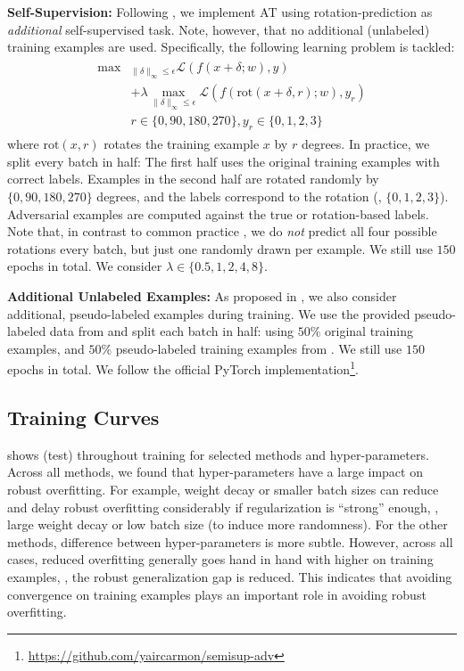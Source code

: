 \textbf{Self-Supervision:} Following \cite{HendrycksNIPS2019}, we implement AT using rotation-prediction as \emph{additional} self-supervised task. Note, however, that no additional (unlabeled) training examples are used. Specifically, the following learning problem is tackled:
\begin{align}
	\begin{split}
		\max&_{\|\delta\|_\infty \leq \epsilon} \mathcal{L}(f(x + \delta;w), y)\\
		&+ \lambda \max_{\|\delta\|_\infty \leq \epsilon} \mathcal{L}(f(\text{rot}(x + \delta, r); w), y_{r})\\
		&r\in\{0, 90, 180, 270\}, y_r \in \{0, 1, 2, 3\}
	\end{split}
\end{align}
where $\text{rot}(x, r)$ rotates the training example $x$ by $r$ degrees.
In practice, we split every batch in half: The first half uses the original training examples with correct labels. Examples in the second half are rotated randomly by $\{0, 90, 180, 270\}$ degrees, and the labels correspond to the rotation (\ie, $\{0, 1, 2, 3\}$). Adversarial examples are computed against the true or rotation-based labels. Note that, in contrast to common practice \cite{SohnARXIV2020}, we do \emph{not} predict all four possible rotations every batch, but just one randomly drawn per example. We still use $150$ epochs in total. We consider $\lambda \in \{0.5, 1, 2, 4, 8\}$.
 
\textbf{Additional Unlabeled Examples:} As proposed in \cite{CarmonNIPS2019,UesatoNIPS2019}, we also consider additional, pseudo-labeled examples during training. We use the provided pseudo-labeled data from \cite{CarmonNIPS2019} and split each batch in half: using $50\%$ original \CifarT training examples, and $50\%$ pseudo-labeled training examples from \cite{CarmonNIPS2019}. We still use $150$ epochs in total. We follow the official PyTorch implementation\footnote{\url{https://github.com/yaircarmon/semisup-adv}}.

\subsection{Training Curves}
\label{sec:supp-methods-ablation}

 shows (test) \RCE throughout training for selected methods and hyper-parameters. Across all methods, we found that hyper-parameters have a large impact on robust overfitting. For example, weight decay or smaller batch sizes can reduce and delay robust overfitting considerably if regularization is ``strong'' enough, \ie, large weight decay or low batch size (to induce more randomness). For the other methods, difference between hyper-parameters is more subtle. However, across all cases, reduced overfitting generally goes hand in hand with higher \RCE on training examples, \ie, the robust generalization gap is reduced. This indicates that avoiding convergence on training examples plays an important role in avoiding robust overfitting.

